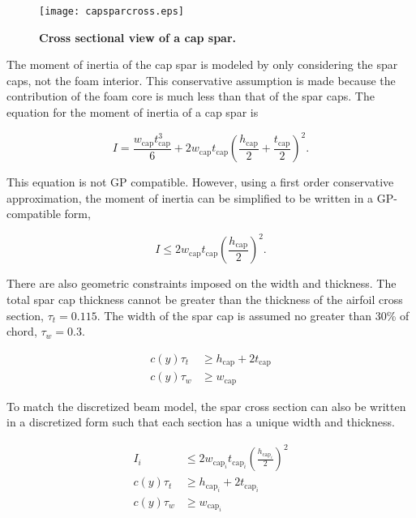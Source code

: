 \begin{figure}[h!]
	\begin{center}
	\texttt{[image: capsparcross.eps]}
    \caption{\textbf{Cross sectional view of a cap spar.}}
	\label{f:capspar}
	\end{center}
\end{figure}

The moment of inertia of the cap spar is modeled by only considering the spar caps, not the foam interior.  
This conservative assumption is made because the contribution of the foam core is much less than that of the spar caps.  
The equation for the moment of inertia\cite{bending} of a cap spar is 

\begin{equation}
    \label{e:moispar}
    I = \frac{w_{\text{cap}}t_{\text{cap}}^3}{6} + 2w_{\text{cap}}t_{\text{cap}}\left( \frac{h_{\text{cap}}}{2} + \frac{t_{\text{cap}}}{2} \right)^2.
\end{equation}

This equation is not GP compatible.  However, using a first order conservative approximation, the moment of inertia can be simplified to be written in a GP-compatible form, 

\begin{equation}
    \label{e:moispar}
    I \leq 2w_{\text{cap}}t_{\text{cap}}\left(\frac{h_{\text{cap}}}{2}\right)^2.
\end{equation}

There are also geometric constraints imposed on the width and thickness.  The total spar cap thickness cannot be greater than the thickness of the airfoil cross section, $\tau_t = 0.115$.  The width of the spar cap is assumed no greater than 30\% of chord, $\tau_w = 0.3$.

\begin{align}
    \label{e:thickness}
    c(y)\tau_t &\geq h_{\text{cap}} + 2t_{\text{cap}} \\
    \label{e:width}
    c(y)\tau_w &\geq w_{\text{cap}} 
    \end{align}

To match the discretized beam model, the spar cross section can also be written in a discretized form such that each section has a unique width and thickness. 

\begin{align}
    I_i &\leq 2w_{\text{cap}_i}t_{\text{cap}_i}\left(\frac{h_{\text{cap}_i}}{2}\right)^2 \\
    c(y)\tau_t &\geq h_{\text{cap}_i} + 2t_{\text{cap}_i} \\
    c(y)\tau_w &\geq w_{\text{cap}_i} 
\end{align}

